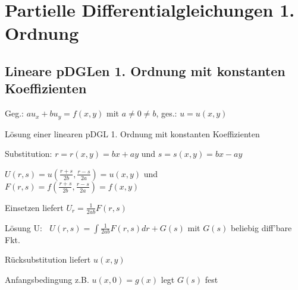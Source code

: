 \documentclass[german,color,5pt]{latex4ei/latex4ei_fs}
\begin{document}
\section{Partielle Differentialgleichungen 1. Ordnung}

\begin{sectionbox}
	\subsection{Lineare pDGLen 1. Ordnung mit konstanten Koeffizienten}
	Geg.: $a u_x+b u_y =f(x,y)$ mit $a \neq 0 \neq b$, ges.: $u=u(x,y)$
	\begin{cookbox}{Lösung einer linearen pDGL 1. Ordnung mit konstanten Koeffizienten}
		\item Substitution: $r=r(x,y)=bx+ay$ und $s=s(x,y)=bx-ay$
		\item $U(r,s) = u(\frac{r+s}{2b},\frac{r-s}{2a}) = u(x,y)$  und \\ $F(r,s) = f(\frac{r+s}{2b},\frac{r-s}{2a}) = f(x,y)$
		\item Einsetzen liefert $U_{r}=\frac{1}{2ab}F(r,s) $
		\item Lösung U: $\; \; U(r,s)=\int \frac{1}{2ab} F(r,s)dr+G(s)$ mit $G(s)$ beliebig diff'bare Fkt.
		\item Rücksubstitution liefert $u(x,y)$
		\item Anfangsbedingung z.B. $u(x,0) = g(x)$ legt $G(s)$ fest
	\end{cookbox}
\end{sectionbox}
\end{document}
